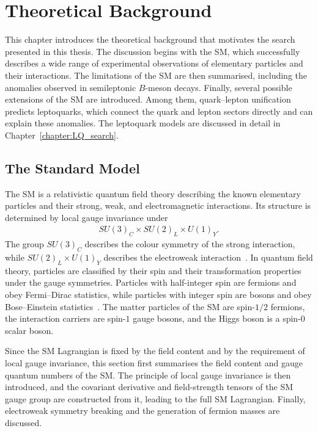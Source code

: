 \chapter{Theoretical Background}
\label{chapter:theoretical_background}

This chapter introduces the theoretical background that motivates the search presented in this thesis.
The discussion begins with the SM, which successfully describes a wide range of experimental observations of elementary particles and their interactions.
The limitations of the SM are then summarised, including the anomalies observed in semileptonic $B$-meson decays.
Finally, several possible extensions of the SM are introduced.
Among them, quark--lepton unification predicts leptoquarks, which connect the quark and lepton sectors directly and can explain these anomalies.
The leptoquark models are discussed in detail in Chapter~\ref{chapter:LQ_search}.

\section{The Standard Model}
\label{sec:sm}

The SM is a relativistic quantum field theory describing the known elementary particles and their strong, weak, and electromagnetic interactions. 
Its structure is determined by local gauge invariance under
\begin{align*}
    SU(3)_{C} \times SU(2)_{L} \times U(1)_{Y}.
\end{align*}
The group $SU(3)_{C}$ describes the colour symmetry of the strong interaction, while $SU(2)_{L} \times U(1)_{Y}$ describes the electroweak interaction~\cite{Glashow1961,Weinberg1967,Salam1968}. 
In quantum field theory, particles are classified by their spin and their transformation properties under the gauge symmetries. 
Particles with half-integer spin are fermions and obey Fermi--Dirac statistics, while particles with integer spin are bosons and obey Bose--Einstein statistics~\cite{Pauli1940}. 
The matter particles of the SM are spin-$1/2$ fermions, the interaction carriers are spin-$1$ gauge bosons, and the Higgs boson is a spin-$0$ scalar boson.

Since the SM Lagrangian is fixed by the field content and by the requirement of local gauge invariance, this section first summarises the field content and gauge quantum numbers of the SM. The principle of local gauge invariance is then introduced, and the covariant derivative and field-strength tensors of the SM gauge group are constructed from it, leading to the full SM Lagrangian.
Finally, electroweak symmetry breaking and the generation of fermion masses are discussed.



